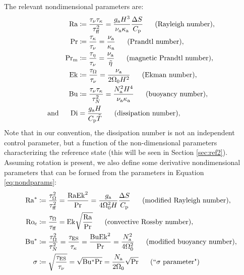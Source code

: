 \documentclass[12pt]{article}
\numberwithin{equation}{section}
\newcommand{\ga}{g_{\rm a}}
\newcommand{\nsqa}{N^2_{\rm a}}
\newcommand{\nua}{\nu_{\rm a}}
\newcommand{\kappaa}{\kappa_{\rm a}}
\begin{document}
	The relevant nondimensional parameters are:
	\begin{subequations}\label{eq:nondparams}
		\begin{align}
			\ra &\define \frac{\taunu\taukappa}{\tauff^2}=\frac{\ga H^3}{\nua \kappaa} \frac{\Delta S}{\cpcap}\five\text{(Rayleigh number)},\\ 
			\pr &\define \frac{\taukappa}{\taunu}=\frac{\nua}{\kappaa}\five\text{(Prandtl number)},\\
			\prm &\define \frac{\taueta}{\taunu}=\frac{\nua}{\tilde{\eta}}\five\text{(magnetic Prandtl number)},\\
			\ek &\define \frac{\tauomega}{\taunu}=\frac{\nua}{2\Omega_0H^2}\five\text{(Ekman number)},\\	
			\bu &\define \frac{\taunu\taukappa}{\taun^2}=\frac{\nsqa H^4}{\nua\kappaa}\five\text{(buoyancy number)},\\
			\andd \di &= \frac{\ga H}{\cpcap\tilde{T}}\five\text{(dissipation number)},
		\end{align}
	\end{subequations}
	Note that in our convention, the dissipation number is not an independent control parameter, but a function of the non-dimensional parameters characterizing the reference state (this will be seen in Section \ref{sec:ref2}). 
	Assuming rotation is present, we also define some derivative nondimensional parameters that can be formed from the parameters in Equation \eqref{eq:nondparams}: 
	\begin{subequations}\label{eq:nondparams2}
	\begin{align}
		\ramod &\define \frac{\tauomega^2}{\tauff^2}=\frac{\ra\ek^2}{\pr}=\frac{\ga}{4\omnought^2H} \frac{\Delta S}{\cpcap}\five\text{(modified Rayleigh number)},\\ 
		\roc&\define \frac{\tauomega}{\tauff}=\ek\sqrt{\frac{\ra}{\pr}}\five\text{(convective Rossby number)},\\
		\bumod &\define \frac{\tauomega^2}{\taun^2}=\frac{\taues}{\taukappa}=\frac{\bu\ek^2}{\pr}=\frac{\nsqa}{4\omnought^2} \five\text{(modified buoyancy number)},\\ 
		\sigma &\define \sqrt{\frac{\taues}{\taunu}}=\sqrt{\bumod\pr} =\frac{N_{\rm a}}{2\omnought}\sqrt{\pr}\five\text{(``$\sigma$ parameter")}
		\end{align}
	\end{subequations}
\end{document}

